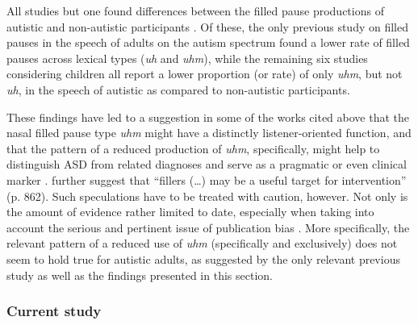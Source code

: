 All studies but one \citep{suhNarrativePerformanceOptimal2014} found differences between the filled pause productions of autistic and non-autistic participants \citep[but see also related results in][]{booConversationVirtualReality2022}. Of these, the only previous study on filled pauses in the speech of adults on the autism spectrum found a lower rate of filled pauses across lexical types (\emph{uh} and \emph{uhm}), while the remaining six studies considering children all report a lower proportion (or rate) of only \emph{uhm}, but not \emph{uh}, in the speech of autistic as compared to non-autistic participants.

These findings have led to a suggestion in some of the works cited above that the nasal filled pause type \emph{uhm} might have a distinctly listener-oriented function, and that the pattern of a reduced production of \emph{uhm}, specifically, might help to distinguish ASD from related diagnoses \citep{gormanUhUmChildren2016} and serve as a pragmatic \citep{irvineUhUmAutism2016} or even clinical marker \citep{mcgregorBriefReportUm2020}. \citet{gormanUhUmChildren2016} further suggest that ``fillers (…) may be a useful target for intervention” (p. 862). Such speculations have to be treated with caution, however. Not only is the amount of evidence rather limited to date, especially when taking into account the serious and pertinent issue of publication bias \citep[whereby studies that find a ``significant” effect are vastly more likely to be published than those that do not;][]{devitoCatalogueBiasPublication2019,easterbrookPublicationBiasClinical1991,johnMeasuringPrevalenceQuestionable2012,sterlingPublicationDecisionsTheir1959}. More specifically, the relevant pattern of a reduced use of \emph{uhm} (specifically and exclusively) does not seem to hold true for autistic adults, as suggested by the only relevant previous study \citep{lakeListenerVsSpeakeroriented2011} as well as the findings presented in this section.

\subsubsection{Current study}\label{BCFP_FP_background_current}


